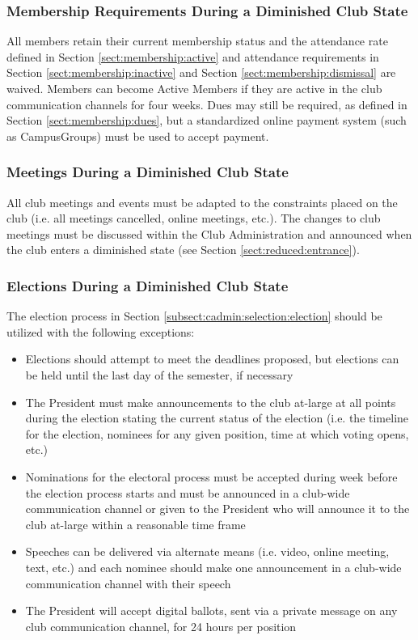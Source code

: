 \documentclass[english,11pt]{article}
\begin{document}
\subsubsection{Membership Requirements During a Diminished Club State} \label{subsect:reduced:membership}
All members retain their current membership status and the attendance rate defined in Section \ref{sect:membership:active} and attendance requirements in Section \ref{sect:membership:inactive} and Section \ref{sect:membership:dismissal} are waived.
Members can become Active Members if they are active in the club communication channels for four weeks.
Dues may still be required, as defined in Section \ref{sect:membership:dues}, but a standardized online payment system (such as CampusGroups) must be used to accept payment.

\subsubsection{Meetings During a Diminished Club State} \label{subsect:reduced:meetings}
All club meetings and events must be adapted to the constraints placed on the club (i.e. all meetings cancelled, online meetings, etc.).
The changes to club meetings must be discussed within the Club Administration and announced when the club enters a diminished state (see Section \ref{sect:reduced:entrance}).

\subsubsection{Elections During a Diminished Club State} \label{subsect:reduced:cadmin}
The election process in Section \ref{subsect:cadmin:selection:election} should be utilized with the following exceptions:

\begin{itemize}
    \item Elections should attempt to meet the deadlines proposed, but elections can be held until the last day of the semester, if necessary
    \item The President must make announcements to the club at-large at all points during the election stating the current status of the election (i.e. the timeline for the election, nominees for any given position, time at which voting opens, etc.)
    \item Nominations for the electoral process must be accepted during week before the election process starts and must be announced in a club-wide communication channel or given to the President who will announce it to the club at-large within a reasonable time frame
    \item Speeches can be delivered via alternate means (i.e. video, online meeting, text, etc.) and each nominee should make one announcement in a club-wide communication channel with their speech 
    \item The President will accept digital ballots, sent via a private message on any club communication channel, for 24 hours per position
\end{itemize}
\end{document}
